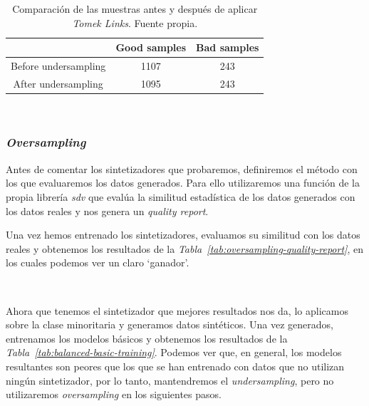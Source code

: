 \begin{table}
    \centering
    \begin{tabular}{|c|cc|} \hline
        & Good samples & Bad samples \\ \hline
        Before undersampling & 1107 & 243 \\
        After undersampling & 1095 & 243 \\ \hline
    \end{tabular}
    \caption{Comparación de las muestras antes y después de aplicar \textit{Tomek Links}. Fuente propia.}\ \label{tab:balance-tl-comparison}
\end{table}


\clearpage

\subsubsection{\textit{Oversampling}}

Antes de comentar los sintetizadores que probaremos, definiremos el método con los que evaluaremos los datos generados. Para ello utilizaremos una función de la propia librería \textit{sdv} que evalúa la similitud estadística de los datos generados con los datos reales y nos genera un \textit{quality report}.

Una vez hemos entrenado los sintetizadores, evaluamos su similitud con los datos reales y obtenemos los resultados de la \textit{Tabla\ \ref{tab:oversampling-quality-report}}, en los cuales podemos ver un claro `ganador'.

\begin{table}[!ht]
    \centering
    \caption{Resultados del \textit{quality report} de los datos generados con los sintetizadores. Fuente propia}\ \label{tab:oversampling-quality-report}
\end{table}

Ahora que tenemos el sintetizador que mejores resultados nos da, lo aplicamos sobre la clase minoritaria y generamos datos sintéticos. Una vez generados, entrenamos los modelos básicos y obtenemos los resultados de la \textit{Tabla\ \ref{tab:balanced-basic-training}}. Podemos ver que, en general, los modelos resultantes son peores que los que se han entrenado con datos que no utilizan ningún sintetizador, por lo tanto, mantendremos el \textit{undersampling}, pero no utilizaremos \textit{oversampling} en los siguientes pasos.


